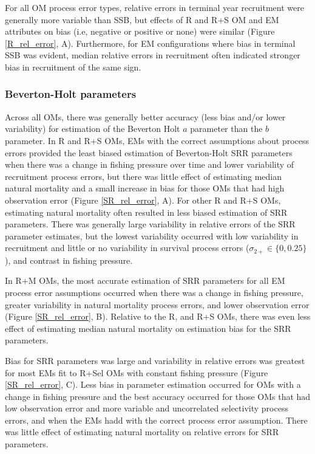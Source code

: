 \documentclass[
  12pt,
]{article}
\begin{document}
For all OM process error types, relative errors in terminal year
recruitment were generally more variable than SSB, but effects of R and
R+S OM and EM attributes on bias (i.e, negative or positive or none)
were similar (Figure \ref{R_rel_error}, A). Furthermore, for EM
configurations where bias in terminal SSB was evident, median relative
errors in recruitment often indicated stronger bias in recruitment of
the same sign.

\hypertarget{beverton-holt-parameters}{%
\subsubsection*{Beverton-Holt
parameters}\label{beverton-holt-parameters}}

Across all OMs, there was generally better accuracy (less bias and/or
lower variability) for estimation of the Beverton Holt \(a\) parameter
than the \(b\) parameter. In R and R+S OMs, EMs with the correct
assumptions about process errors provided the least biased estimation of
Beverton-Holt SRR parameters when there was a change in fishing pressure
over time and lower variability of recruitment process errors, but there
was little effect of estimating median natural mortality and a small
increase in bias for those OMs that had high observation error (Figure
\ref{SR_rel_error}, A). For other R and R+S OMs, estimating natural
mortality often resulted in less biased estimation of SRR parameters.
There was generally large variability in relative errors of the SRR
parameter estimates, but the lowest variability occurred with low
variability in recruitment and little or no variability in survival
process errors (\(\sigma_{2+} \in \{0,0.25\}\)), and contrast in fishing
pressure.

In R+M OMs, the most accurate estimation of SRR parameters for all EM
process error assumptions occurred when there was a change in fishing
pressure, greater variability in natural mortality process errors, and
lower observation error (Figure \ref{SR_rel_error}, B). Relative to the
R, and R+S OMs, there was even less effect of estimating median natural
mortality on estimation bias for the SRR parameters.

Bias for SRR parameters was large and variability in relative errors was
greatest for most EMs fit to R+Sel OMs with constant fishing pressure
(Figure \ref{SR_rel_error}, C). Less bias in parameter estimation
occurred for OMs with a change in fishing pressure and the best accuracy
occurred for those OMs that had low observation error and more variable
and uncorrelated selectivity process errors, and when the EMs hadd with
the correct process error assumption. There was little effect of
estimating natural mortality on relative errors for SRR parameters.
\end{document}
